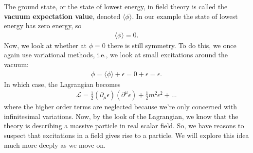 \documentclass[a4paper,11pt]{article}
\numberwithin{equation}{section}
\theoremstyle{definition}
\newcommand{\p}{\partial}
\newcommand{\lag}{\mathcal{L}}
\begin{document}
The ground state, or the state of lowest energy, in field theory is called the \textbf{vacuum expectation value}, denoted $\langle \phi \rangle$. In our example the state of lowest energy has zero energy, so
\begin{align}
\langle \phi \rangle  = 0.
\end{align}
Now, we look at whether at $\phi = 0$ there is still symmetry. To do this, we once again use variational methods, i.e., we look at small excitations around the vacuum:
\begin{align}
\phi = \langle \phi \rangle + \epsilon = 0+\epsilon = \epsilon.
\end{align}
In which case, the Lagrangian becomes
\begin{align}
\lag = \frac{1}{2}(\p_\mu\epsilon)(\p^\mu\epsilon) + \frac{1}{2}m^2\epsilon^2+\dots
\end{align}
where the higher order terms are neglected because we're only concerned with infinitesimal variations. Now, by the look of the Lagrangian, we know that the theory is describing a massive particle in real scalar field. So, we have reasons to suspect that excitations in a field gives rise to a particle. We will explore this idea much more deeply as we move on.\\
\end{document}
